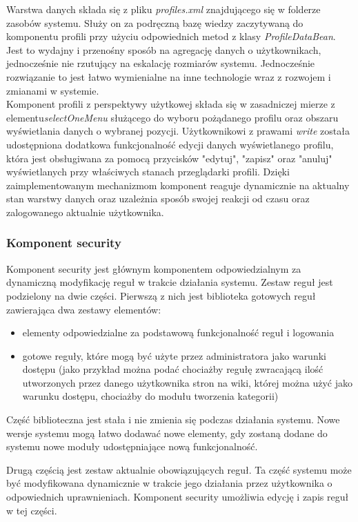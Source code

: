 \documentclass{classrep}
\begin{document}
Warstwa danych składa się z pliku \textit{profiles.xml} znajdującego się w folderze zasobów systemu. Służy on za podręczną bazę wiedzy zaczytywaną do komponentu profili przy użyciu odpowiednich metod z klasy \textit{ProfileDataBean}. Jest to wydajny i przenośny sposób na agregację danych o użytkownikach, jednocześnie nie rzutujący na eskalację rozmiarów systemu. Jednocześnie rozwiązanie to jest łatwo wymienialne na inne technologie wraz z rozwojem i zmianami w systemie. \\
Komponent profili z perspektywy użytkowej składa się w zasadniczej mierze z elementu\textit{selectOneMenu} służącego do wyboru pożądanego profilu oraz obszaru wyświetlania danych o wybranej pozycji. Użytkownikowi z prawami \textit{write} została udostępniona dodatkowa funkcjonalność edycji danych wyświetlanego profilu, która jest obsługiwana za pomocą przycisków "edytuj", "zapisz" oraz "anuluj" wyświetlanych przy właściwych stanach przeglądarki profili. Dzięki zaimplementowanym mechanizmom komponent reaguje dynamicznie na aktualny stan warstwy danych oraz uzależnia sposób swojej reakcji od czasu oraz zalogowanego aktualnie użytkownika.

\subsubsection{Komponent security}
Komponent security jest głównym komponentem odpowiedzialnym za dynamiczną modyfikację reguł w trakcie działania systemu. Zestaw reguł jest podzielony na dwie części. 
Pierwszą z nich jest biblioteka gotowych reguł zawierająca dwa zestawy elementów:
\begin{itemize}
\item elementy odpowiedzialne za podstawową funkcjonalność reguł i logowania
\item gotowe reguły, które mogą być użyte przez administratora jako warunki dostępu (jako przykład można podać chociażby regułę zwracającą ilość utworzonych przez danego
      użytkownika stron na wiki, której można użyć jako warunku dostępu, chociażby do modułu tworzenia kategorii)
\end{itemize}
Część biblioteczna jest stała i nie zmienia się podczas działania systemu. Nowe wersje systemu mogą łatwo dodawać nowe elementy, gdy zostaną dodane do systemu nowe moduły
udostępniające nową funkcjonalność.

Drugą częścią jest zestaw aktualnie obowiązujących reguł. Ta część systemu może być modyfikowana dynamicznie w trakcie jego działania przez użytkownika o odpowiednich uprawnieniach.
Komponent security umożliwia edycję i zapis reguł w tej części.
\end{document}
